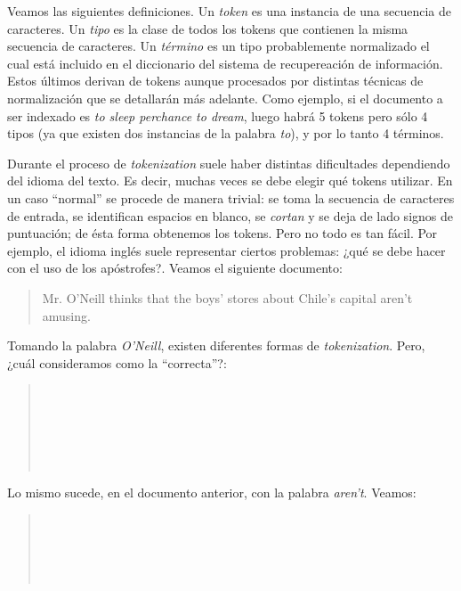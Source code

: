 		Veamos las siguientes definiciones. Un \textit{token} es una instancia de una secuencia de caracteres. Un \textit{tipo} es la clase de todos los tokens que contienen la misma secuencia de caracteres. Un \textit{término} es un tipo probablemente normalizado el cual está incluido en el diccionario del sistema de recupereación de información. Estos últimos derivan de tokens aunque procesados por distintas técnicas de normalización que se detallarán más adelante. Como ejemplo, si el documento a ser indexado es \textit{to sleep perchance to dream}, luego habrá 5 tokens pero sólo 4 tipos (ya que existen dos instancias de la palabra \textit{to}), y por lo tanto 4 términos.
		
		Durante el proceso de \textit{tokenization} suele haber distintas dificultades dependiendo del idioma del texto. Es decir, muchas veces se debe elegir qué tokens utilizar. En un caso \enquote{normal} se procede de manera trivial: se toma la secuencia de caracteres de entrada, se identifican espacios en blanco, se \textit{cortan} y se deja de lado signos de puntuación; de ésta forma obtenemos los tokens. Pero no todo es tan fácil. Por ejemplo, el idioma inglés suele representar ciertos problemas: ¿qué se debe hacer con el uso de los apóstrofes?. Veamos el siguiente documento:
		\begin{quote}
			Mr. O'Neill thinks that the boys' stores about Chile's capital aren't amusing.
		\end{quote}
		
		Tomando la palabra \textit{O'Neill}, existen diferentes formas de \textit{tokenization}. Pero, ¿cuál consideramos como la \enquote{correcta}?:
		\begin{quote}
			\begin{ttfamily}
				 \\
				 \\
				 \\
				  \\
				  \\
			\end{ttfamily}
		\end{quote}
		
		Lo mismo sucede, en el documento anterior, con la palabra \textit{aren't}. Veamos:
		\begin{quote}
			\begin{ttfamily}
				\fbox{aren't} \\
				\fbox{arent} \\
				 \fbox{n't} \\
				 \fbox{t} \\
			\end{ttfamily}
		\end{quote}
		
